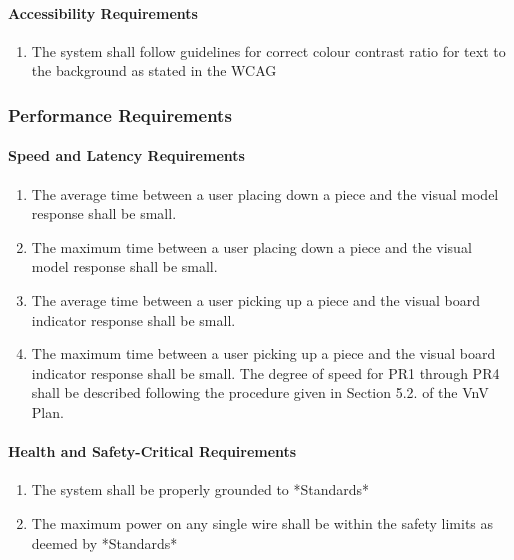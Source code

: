 \documentclass[12pt]{article}
\begin{document}
\paragraph{Accessibility Requirements}
\begin{enumerate}[{UH}1., leftmargin=2\parindent, resume]
    \item The system shall follow guidelines for correct colour contrast ratio for text to the background as stated in the WCAG \cite{WCAG2018}
\end{enumerate}



\subsubsection{Performance Requirements}
\label{NFR_PR}
\paragraph{Speed and Latency Requirements}
\begin{enumerate}[{PR}1., leftmargin=2\parindent]
    \item The average time between a user placing down a piece and the visual model response shall be small.
    \item The maximum time between a user placing down a piece and the visual model response shall be small.
    \item The average time between a user picking up a piece and the visual board indicator response shall be small.
    \item The maximum time between a user picking up a piece and the visual board indicator response shall be small. 
    The degree of speed for PR1 through PR4 shall be described following the procedure given in Section 5.2.\thevnvSectionNfr{}
    of the VnV Plan.
\end{enumerate}

\paragraph{Health and Safety-Critical Requirements}
\begin{enumerate}[{PR}1., leftmargin=2\parindent, resume]
    \item The system shall be properly grounded to *Standards*
    \item The maximum power on any single wire shall be within the safety limits as deemed by *Standards*
\end{enumerate}
\end{document}
